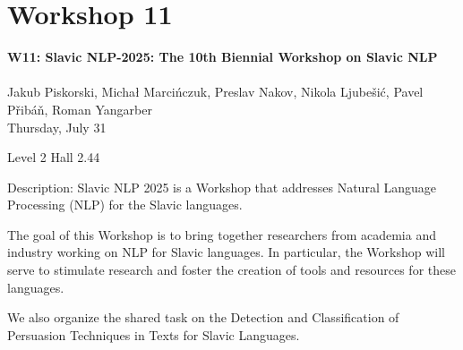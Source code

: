 \clearpage



\section[W11: Slavic NLP-2025: The 10th Biennial Workshop on Slavic NLP]{Workshop 11}
\label{workshop_11}

\begin{center}
    {\Large \textbf{W11: Slavic NLP-2025: The 10th Biennial Workshop on Slavic NLP}}\\
    
\\

   Jakub Piskorski, Michał Marcińczuk, Preslav Nakov, Nikola Ljubešić, Pavel Přibáň, Roman Yangarber\\

    Thursday, July 31
    
   Level 2 Hall 2.44

\end{center}

Description: Slavic NLP 2025 is a Workshop that addresses Natural Language Processing (NLP) for the Slavic languages.

The goal of this Workshop is to bring together researchers from academia and industry working on NLP for Slavic languages. In particular, the Workshop will serve to stimulate research and foster the creation of tools and resources for these languages.

We also organize the shared task on the Detection and Classification of Persuasion Techniques in Texts for Slavic Languages.

